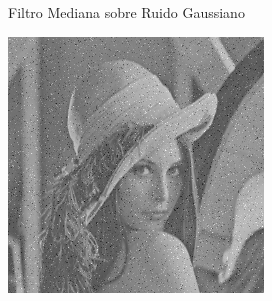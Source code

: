 \documentclass{beamer}
\begin{document}
\begin{frame}[fragile]{Filtro Mediana sobre Ruido Gaussiano}
\begin{minipage}{0.25\linewidth}
	\end{minipage}\hfill
	\begin{minipage}{0.25\linewidth}
		\centering
		\includegraphics[width=\linewidth]{../results/lena_gauss_sigma50}
	\end{minipage}
	

\end{frame}
\end{document}

